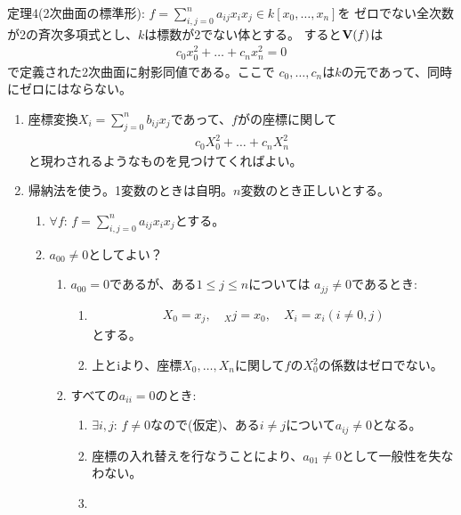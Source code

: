 \begin{framed}
  定理4(2次曲面の標準形):
  $f=\sum_{i,j=0}^n a_{ij}x_i x_j \in k[x_0,\dots,x_n]$を
  ゼロでない全次数が2の斉次多項式とし、$k$は標数が2でない体とする。
  すると$\textbf V(f)$は
  \begin{align}
    c_0 x_0^2 + \dots + c_n x_n^2 = 0
  \end{align}
  で定義された2次曲面に射影同値である。ここで
  $c_0,\dots,c_n$は$k$の元であって、同時にゼロにはならない。
\end{framed}
\begin{myproof}
  \begin{enumerate}
    \item
    座標変換$X_i = \sum_{j=0}^n b_{ij}x_j$であって、$f$がの座標に関して
    \begin{align}
      c_0 X_0^2 + \dots +c_n X_n^2
    \end{align}
    と現わされるようなものを見つけてくればよい。
    \item
    帰納法を使う。1変数のときは自明。$n$変数のとき正しいとする。
    \begin{enumerate}
      \item $\forall f$: $f = \sum_{i,j=0}^n a_{ij}x_i x_j$とする。
      \item $a_{00} \neq 0$としてよい？
      \begin{enumerate}
        \item $a_{00}=0$であるが、ある$1\le j \le n$については
        $a_{jj}\neq 0$であるとき:
        \begin{enumerate}
          \item
          \begin{align}
            X_0 = x_j,\quad _Xj = x_0,\quad X_i = x_i (i\neq 0,j)
          \end{align}
          とする。
          \item
          上とiより、座標$X_0,\dots,X_n$に関して$f$の$X_0^2$の係数はゼロでない。
        \end{enumerate}
        \item すべての$a_{ii}=0$のとき:
        \begin{enumerate}
          \item $\exists i,j$:
          $f\neq 0$なので(仮定)、ある$i\neq j$について$a_{ij} \neq 0$となる。
          \item
          座標の入れ替えを行なうことにより、$a_{01}\neq 0$として一般性を失なわない。
          \item
          \begin{align}

\end{align}
\end{enumerate}
\end{enumerate}
\end{enumerate}
\end{enumerate}
\end{myproof}
